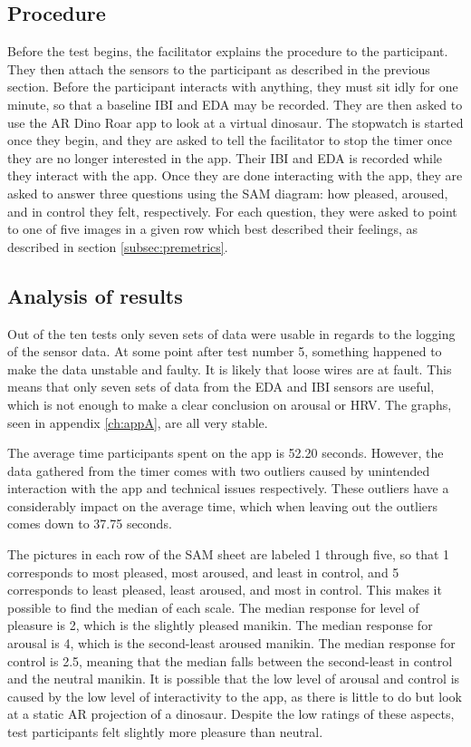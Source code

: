 \subsection{Procedure}
Before the test begins, the facilitator explains the procedure to the participant. They then attach the sensors to the participant as described in the previous section. Before the participant interacts with anything, they must sit idly for one minute, so that a baseline IBI and EDA may be recorded. They are then asked to use the AR Dino Roar app to look at a virtual dinosaur. The stopwatch is started once they begin, and they are asked to tell the facilitator to stop the timer once they are no longer interested in the app. Their IBI and EDA is recorded while they interact with the app. Once they are done interacting with the app, they are asked to answer three questions using the SAM diagram: how pleased, aroused, and in control they felt, respectively. For each question, they were asked to point to one of five images in a given row which best described their feelings, as described in section \ref{subsec:premetrics}.

\subsection{Analysis of results}
Out of the ten tests only seven sets of data were usable in regards to the logging of the sensor data. At some point after test number 5, something happened to make the data unstable and faulty. It is likely that loose wires are at fault. This means that only seven sets of data from the EDA and IBI sensors are useful, which is not enough to make a clear conclusion on arousal or HRV. The graphs, seen in appendix \ref{ch:appA}, are all very stable.

The average time participants spent on the app is 52.20 seconds. However, the data gathered from the timer comes with two outliers caused by unintended interaction with the app and technical issues respectively. These outliers have a considerably impact on the average time, which when leaving out the outliers comes down to 37.75 seconds. 

The pictures in each row of the SAM sheet are labeled 1 through five, so that 1 corresponds to most pleased, most aroused, and least in control, and 5 corresponds to least pleased, least aroused, and most in control. This makes it possible to find the median of each scale. The median response for level of pleasure is 2, which is the slightly pleased manikin. The median response for arousal is 4, which is the second-least aroused manikin. The median response for control is 2.5, meaning that the median falls between the second-least in control and the neutral manikin. It is possible that the low level of arousal and control is caused by the low level of interactivity to the app, as there is little to do but look at a static AR projection of a dinosaur. Despite the low ratings of these aspects, test participants felt slightly more pleasure than neutral. 

